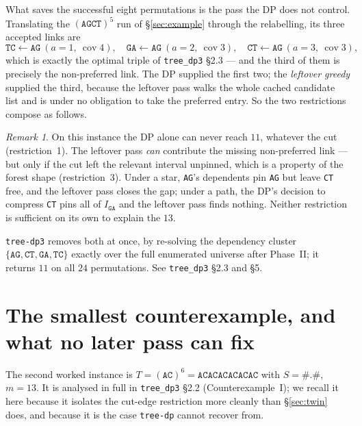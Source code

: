 \documentclass[11pt,a4paper]{article}
\theoremstyle{definition}
\theoremstyle{plain}
\theoremstyle{remark}
\newtheorem{remark}{Remark}
\newcommand{\cov}{\operatorname{cov}}
\begin{document}
What saves the successful eight permutations is the pass the DP does not
control. Translating the $(\mathtt{AGCT})^5$ run of \S\ref{sec:example}
through the relabelling, its three accepted links are
\[
  \mathtt{TC} \leftarrow \mathtt{AG}\ (a{=}1,\ \cov 4),\quad
  \mathtt{GA} \leftarrow \mathtt{AG}\ (a{=}2,\ \cov 3),\quad
  \mathtt{CT} \leftarrow \mathtt{AG}\ (a{=}3,\ \cov 3),
\]
which is exactly the optimal triple of \texttt{tree\_dp3} \S2.3 --- and
the third of them is precisely the non-preferred link. The DP supplied
the first two; the \emph{leftover greedy} supplied the third, because
the leftover pass walks the whole cached candidate list and is under no
obligation to take the preferred entry. So the two restrictions
compose as follows.

\begin{remark}
\label{rem:interaction}
On this instance the DP alone can never reach $11$, whatever the cut
(restriction~1). The leftover pass \emph{can} contribute the missing
non-preferred link --- but only if the cut left the relevant interval
unpinned, which is a property of the forest shape (restriction~3).
Under a star, \texttt{AG}'s dependents pin \texttt{AG} but leave
\texttt{CT} free, and the leftover pass closes the gap; under a path,
the DP's decision to compress \texttt{CT} pins all of $I_{\mathtt{GA}}$
and the leftover pass finds nothing. Neither restriction is sufficient
on its own to explain the $13$.
\end{remark}

\texttt{tree-dp3} removes both at once, by re-solving the dependency
cluster $\{\mathtt{AG},\mathtt{CT},\mathtt{GA},\mathtt{TC}\}$ exactly
over the full enumerated universe after Phase~II; it returns $11$ on all
$24$ permutations. See \texttt{tree\_dp3} \S2.3 and \S5.

\section{The smallest counterexample, and what no later pass can fix}
\label{sec:ce}

The second worked instance is
$T = (\mathtt{AC})^6 = \mathtt{ACACACACACAC}$ with $S = \mathtt{\#.\#}$,
$m = 13$. It is analysed in full in \texttt{tree\_dp3} \S2.2
(Counterexample~I); we recall it here because it isolates the cut-edge
restriction more cleanly than \S\ref{sec:twin} does, and because it is
the case \texttt{tree-dp} cannot recover from.
\end{document}
